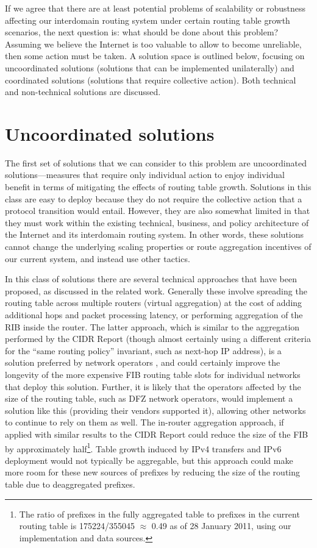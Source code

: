If we agree that there are at least potential problems of scalability or
robustness affecting our interdomain routing system under certain routing table
growth scenarios, the next question is: what should be done about this problem?
Assuming we believe the Internet is too valuable to allow to become unreliable,
then some action must be taken. A solution space is outlined below, focusing
on uncoordinated solutions (solutions that can be implemented unilaterally) and
coordinated solutions (solutions that require collective action). Both technical
and non-technical solutions are discussed.

\section{Uncoordinated solutions}
The first set of solutions that we can consider to this problem are
uncoordinated solutions---measures that require only individual action to
enjoy individual benefit in terms of mitigating the effects of routing table
growth. Solutions in this class are easy to deploy because they do not require
the collective action that a protocol transition would entail. However, they
are also somewhat limited in that they must work within the existing technical,
business, and policy architecture of the Internet and its interdomain routing
system. In other words, these solutions cannot change the underlying scaling
properties or route aggregation incentives of our current system, and instead
use other tactics.

In this class of solutions there are several technical approaches that have
been proposed, as discussed in the related work. Generally these involve
spreading the routing table across multiple routers (virtual aggregation)
\cite{Ballani:2009tg} at the cost of adding additional hops and packet
processing latency, or performing aggregation of the RIB inside the router. The
latter approach, which is similar to the aggregation performed by the CIDR
Report (though almost certainly using a different criteria for the ``same
routing policy'' invariant, such as next-hop IP address),
is a solution preferred by network operators \cite{Zhao:2010fu}, and could
certainly improve the longevity of the more expensive FIB routing table slots
for individual networks that deploy this solution. Further, it is likely that
the operators affected by the size of the routing table, such as DFZ network
operators, would implement a solution like this (providing their vendors
supported it), allowing other networks to continue to rely on them as well. The
in-router aggregation approach, if applied with similar results to the CIDR
Report could reduce the size of the FIB by approximately half\footnote{The
ratio of prefixes in the fully aggregated table to prefixes in the current
routing table is 175224/355045 $\approx$ 0.49 as of 28 January 2011, using our
implementation and data sources.}. Table growth induced by IPv4 transfers and
IPv6 deployment would not typically be aggregable, but this approach could make
more room for these new sources of prefixes by reducing the size of the routing
table due to deaggregated prefixes.


